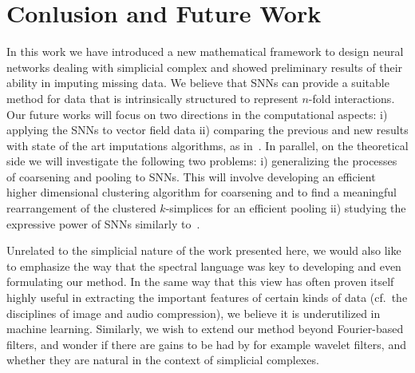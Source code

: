 \section{Conlusion and Future Work}

In this work we have introduced a new mathematical framework to design neural networks dealing with simplicial complex and showed preliminary results of their ability in imputing missing data. We believe that SNNs can provide a suitable method for data that is intrinsically structured to represent $n$-fold interactions.
Our future works will focus on two directions in the computational aspects:  i) applying the SNNs to vector field data ii) comparing the previous and new results with state of the art imputations algorithms, as in~\cite{spinelli2020neural}. 
In parallel, on the theoretical side we will investigate the following two problems: i) generalizing the processes of coarsening and pooling to SNNs. This will involve developing an efficient higher dimensional clustering algorithm for coarsening and to find a meaningful rearrangement of the clustered $k$-simplices for an efficient pooling ii) studying the expressive power of SNNs similarly to~\cite{morris2019weisfeiler}.

Unrelated to the simplicial nature of the work presented here, we would also like to emphasize the way that the spectral language was key to developing and even formulating our method. In the same way that this view has often proven itself highly useful in extracting the important features of certain kinds of data (cf.\ the disciplines of image and audio compression), we believe it is underutilized in machine learning. Similarly, we wish to extend our method beyond Fourier-based filters, and wonder if there are gains to be had by for example wavelet filters, and whether they are natural in the context of simplicial complexes.


